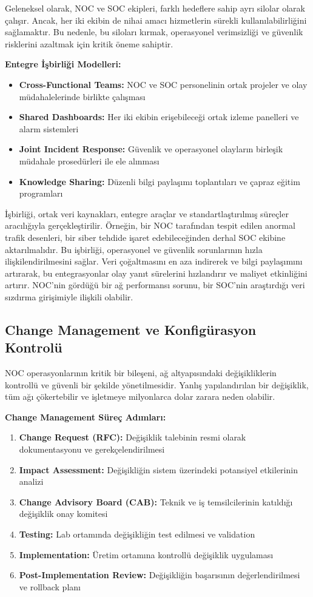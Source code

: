 Geleneksel olarak, NOC ve SOC ekipleri, farklı hedeflere sahip ayrı silolar olarak çalışır. Ancak, her iki ekibin de nihai amacı hizmetlerin sürekli kullanılabilirliğini sağlamaktır. Bu nedenle, bu siloları kırmak, operasyonel verimsizliği ve güvenlik risklerini azaltmak için kritik öneme sahiptir.

\textbf{Entegre İşbirliği Modelleri:}
\begin{itemize}
    \item \textbf{Cross-Functional Teams:} NOC ve SOC personelinin ortak projeler ve olay müdahalelerinde birlikte çalışması
    \item \textbf{Shared Dashboards:} Her iki ekibin erişebileceği ortak izleme panelleri ve alarm sistemleri
    \item \textbf{Joint Incident Response:} Güvenlik ve operasyonel olayların birleşik müdahale prosedürleri ile ele alınması
    \item \textbf{Knowledge Sharing:} Düzenli bilgi paylaşımı toplantıları ve çapraz eğitim programları
\end{itemize}

İşbirliği, ortak veri kaynakları, entegre araçlar ve standartlaştırılmış süreçler aracılığıyla gerçekleştirilir. Örneğin, bir NOC tarafından tespit edilen anormal trafik desenleri, bir siber tehdide işaret edebileceğinden derhal SOC ekibine aktarılmalıdır. Bu işbirliği, operasyonel ve güvenlik sorunlarının hızla ilişkilendirilmesini sağlar. Veri çoğaltmasını en aza indirerek ve bilgi paylaşımını artırarak, bu entegrasyonlar olay yanıt sürelerini hızlandırır ve maliyet etkinliğini artırır. NOC'nin gördüğü bir ağ performansı sorunu, bir SOC'nin araştırdığı veri sızdırma girişimiyle ilişkili olabilir.

\subsection{Change Management ve Konfigürasyon Kontrolü}

NOC operasyonlarının kritik bir bileşeni, ağ altyapısındaki değişikliklerin kontrollü ve güvenli bir şekilde yönetilmesidir. Yanlış yapılandırılan bir değişiklik, tüm ağı çökertebilir ve işletmeye milyonlarca dolar zarara neden olabilir.

\textbf{Change Management Süreç Adımları:}
\begin{enumerate}
    \item \textbf{Change Request (RFC):} Değişiklik talebinin resmi olarak dokumentasyonu ve gerekçelendirilmesi
    \item \textbf{Impact Assessment:} Değişikliğin sistem üzerindeki potansiyel etkilerinin analizi
    \item \textbf{Change Advisory Board (CAB):} Teknik ve iş temsilcilerinin katıldığı değişiklik onay komitesi
    \item \textbf{Testing:} Lab ortamında değişikliğin test edilmesi ve validation
    \item \textbf{Implementation:} Üretim ortamına kontrollü değişiklik uygulaması
    \item \textbf{Post-Implementation Review:} Değişikliğin başarısının değerlendirilmesi ve rollback planı
\end{enumerate}

